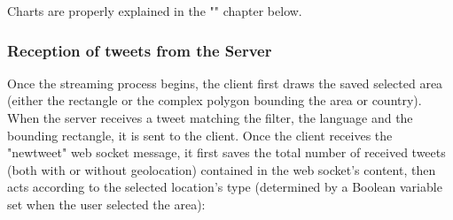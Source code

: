 \documentclass[a4paper,11pt]{report}
\begin{document}
Charts are properly explained in the "" chapter below.
\newpage

\subsubsection{Reception of tweets from the Server}
\label{receptionOftweetsFromTheServer}
Once the streaming process begins, the client first draws the saved selected area (either the rectangle or the complex polygon bounding the area or country). When the server receives a tweet matching the filter, the language and the bounding rectangle, it is sent to the client. Once the client receives the "newtweet" web socket message, it first saves the total number of received tweets (both with or without geolocation) contained in the web socket's content, then acts according to the selected location's type (determined by a Boolean variable set when the user selected the area):
\end{document}
